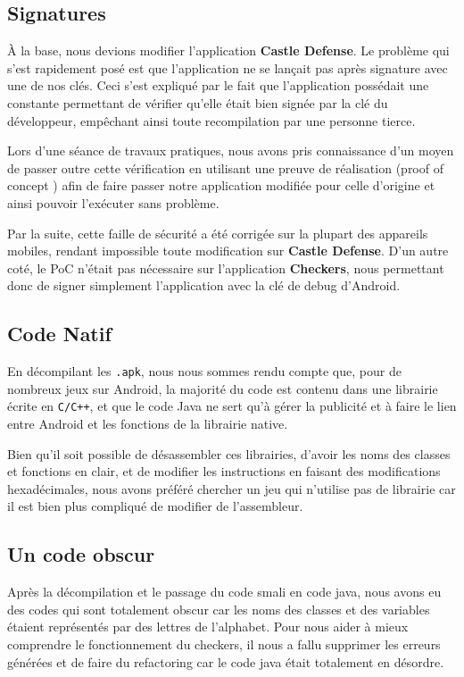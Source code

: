 \subsection{Signatures}

À la base, nous devions modifier l'application \textbf{Castle Defense}.
Le problème qui s'est rapidement posé est que l'application ne se lançait pas après signature avec une de nos clés.
Ceci s'est expliqué par le fait que l'application possédait une constante permettant de vérifier qu'elle était bien signée par la clé du développeur,
empêchant ainsi toute recompilation par une personne tierce.

Lors d'une séance de travaux pratiques, nous avons pris connaissance d'un moyen de passer outre cette vérification en utilisant une preuve de réalisation
(proof of concept \cite{PoC}) afin de faire passer notre application modifiée pour celle d'origine et ainsi pouvoir l'exécuter sans problème.

Par la suite, cette faille de sécurité a été corrigée sur la plupart des appareils mobiles,
rendant impossible toute modification sur \textbf{Castle Defense}.
D'un autre coté, le PoC n'était pas nécessaire sur l'application \textbf{Checkers},
nous permettant donc de signer simplement l'application avec la clé de debug d'Android.


\subsection{Code Natif}

En décompilant les \texttt{.apk}, nous nous sommes rendu compte que, pour de nombreux jeux sur Android, la majorité du code est contenu dans une librairie écrite en \texttt{C/C++}, et que le code Java ne sert qu'à gérer la publicité et à faire le lien entre Android et les fonctions de la librairie native.

Bien qu'il soit possible de désassembler ces librairies, d'avoir les noms des classes et fonctions en clair, et de modifier les instructions en faisant des modifications hexadécimales, nous avons préféré chercher un jeu qui n'utilise pas de librairie car il est bien plus compliqué de modifier de l'assembleur.

\subsection{Un code obscur}

Après la décompilation et le passage du code smali en code java, nous avons eu des codes qui sont totalement obscur car les noms des classes et des variables étaient représentés par des lettres de l’alphabet.
Pour nous aider à mieux comprendre le fonctionnement du checkers, il nous a fallu supprimer les erreurs générées et de faire du refactoring car le code java était totalement en désordre.